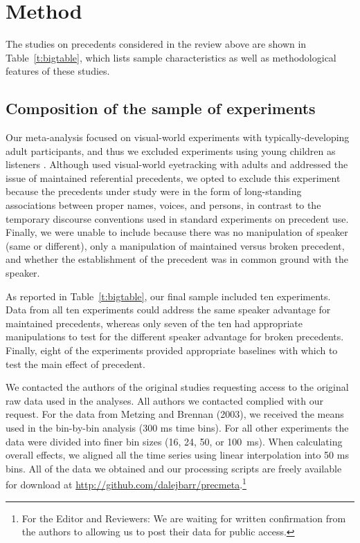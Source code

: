 \documentclass[doc,fignum,apacite,floatsintext]{apa6}
\begin{document}

\section{Method}

The studies on precedents considered in the review above are shown in Table~\ref{t:bigtable}, which lists sample characteristics as well as methodological features of these studies.

\subsection{Composition of the sample of experiments}

Our meta-analysis focused on visual-world experiments with typically-developing adult participants, and thus we excluded experiments using young children as listeners \cite{GrahamSedivyKhu2014,MatthewsLievenTomasello2012}.  Although  used visual-world eyetracking with adults and addressed the issue of maintained referential precedents, we opted to exclude this experiment because the precedents under study were in the form of long-standing associations between proper names, voices, and persons, in contrast to the temporary discourse conventions used in standard experiments on precedent use.  Finally, we were unable to include  because there was no manipulation of speaker (same or different), only a manipulation of maintained versus broken precedent, and whether the establishment of the precedent was in common ground with the speaker.

As reported in Table~\ref{t:bigtable}, our final sample included ten experiments.  Data from all ten experiments could address the same speaker advantage for maintained precedents, whereas only seven of the ten had appropriate manipulations to test for the different speaker advantage for broken precedents.  Finally, eight of the experiments provided appropriate baselines with which to test the main effect of precedent.

We contacted the authors of the original studies requesting access to the original raw data used in the analyses.  All authors we contacted complied with our request.  For the data from Metzing and Brennan (2003), we received the means used in the bin-by-bin analysis (300 ms time bins).  For all other experiments the data were divided into finer bin sizes (16, 24, 50, or 100~ms).  When calculating overall effects, we aligned all the time series using linear interpolation into 50 ms bins.  All of the data we obtained and our processing scripts are freely available for download at \url{http://github.com/dalejbarr/precmeta}.\footnote{For the Editor and Reviewers: We are waiting for written confirmation from the authors to allowing us to post their data for public access.}
\end{document}
